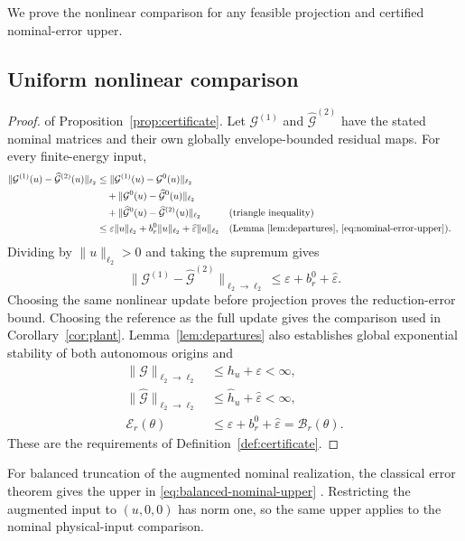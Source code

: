 \documentclass{l4dc2027}
\begin{document}
We prove the nonlinear comparison for any feasible projection and certified nominal-error upper.

\subsection{Uniform nonlinear comparison}
\begin{proof} of Proposition~\ref{prop:certificate}.
Let \mbox{$\mathcal G^{(1)}$} and \mbox{$\widehat{\mathcal G}^{(2)}$} have the stated nominal matrices and their own globally envelope-bounded residual maps.
For every finite-energy input,
\[
 \begin{aligned}
 \|\mathcal G^{(1)}(u)-\widehat{\mathcal G}^{(2)}(u)\|_{\ell_2}
 &\le\|\mathcal G^{(1)}(u)-\mathcal G^0(u)\|_{\ell_2}\\
 &\quad+\|\mathcal G^0(u)-\widehat{\mathcal G}^0(u)\|_{\ell_2}\\
 &\quad+\|\widehat{\mathcal G}^0(u)-\widehat{\mathcal G}^{(2)}(u)\|_{\ell_2}
 &&\text{(triangle inequality)}\\
 &\le\varepsilon\|u\|_{\ell_2}
       +b_r^0\|u\|_{\ell_2}
       +\widehat\varepsilon\|u\|_{\ell_2}
 &&\text{(Lemma~\ref{lem:departures}, \eqref{eq:nominal-error-upper})}.
 \end{aligned}
\]
Dividing by \mbox{$\|u\|_{\ell_2}>0$} and taking the supremum gives
\[
 \|\mathcal G^{(1)}-\widehat{\mathcal G}^{(2)}\|_{\ell_2\to\ell_2}
 \le\varepsilon+b_r^0+\widehat\varepsilon.
\]
Choosing the same nonlinear update before projection proves the reduction-error bound.
Choosing the reference as the full update gives the comparison used in Corollary~\ref{cor:plant}.
Lemma~\ref{lem:departures} also establishes global exponential stability of both autonomous origins and
\[
 \begin{aligned}
 \|\mathcal G\|_{\ell_2\to\ell_2}&\le h_u+\varepsilon<\infty,\\
 \|\widehat{\mathcal G}\|_{\ell_2\to\ell_2}
 &\le\widehat h_u+\widehat\varepsilon<\infty,\\
 \mathcal E_r(\theta)&\le\varepsilon+b_r^0+\widehat\varepsilon
 =\mathcal B_r(\theta).
 \end{aligned}
\]
These are the requirements of Definition~\ref{def:certificate}.
\end{proof}

For balanced truncation of the augmented nominal realization, the classical error theorem gives the upper in \eqref{eq:balanced-nominal-upper} \citep{antoulas}.
Restricting the augmented input to \mbox{$(u,0,0)$} has norm one, so the same upper applies to the nominal physical-input comparison.
\end{document}
